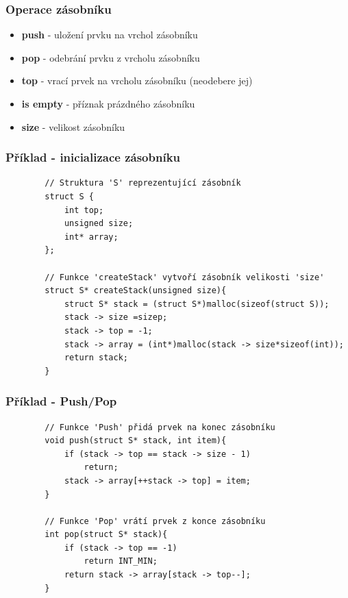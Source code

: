 \documentclass[mode=present, paper=A4paper, orien=landscape, style=default]{beamer}
\begin{document}
\begin{frame}
    \frametitle{Operace zásobníku}
    \begin{itemize}
        \item \textbf{push} - uložení prvku na vrchol zásobníku
        \item \textbf{pop} - odebrání prvku z vrcholu zásobníku
        \item \textbf{top} - vrací prvek na vrcholu zásobníku (neodebere jej)
        \item \textbf{is empty} - příznak prázdného zásobníku
        \item \textbf{size} - velikost zásobníku
    \end{itemize}
\end{frame}

\begin{frame}[fragile]
	\frametitle{Příklad - inicializace zásobníku}  
	\begin{verbatim}
		// Struktura 'S' reprezentující zásobník
		struct S {
		    int top;
		    unsigned size;
		    int* array;
		};
		
		// Funkce 'createStack' vytvoří zásobník velikosti 'size'
		struct S* createStack(unsigned size){
		    struct S* stack = (struct S*)malloc(sizeof(struct S));
		    stack -> size =sizep;
		    stack -> top = -1;
		    stack -> array = (int*)malloc(stack -> size*sizeof(int));
		    return stack;
		}
	\end{verbatim}
\end{frame}

\begin{frame}[fragile]
	\frametitle{Příklad - Push/Pop}  
	\begin{verbatim}
		// Funkce 'Push' přidá prvek na konec zásobníku
		void push(struct S* stack, int item){
		    if (stack -> top == stack -> size - 1)
		        return;
		    stack -> array[++stack -> top] = item;
		}
		 
		// Funkce 'Pop' vrátí prvek z konce zásobníku
		int pop(struct S* stack){
		    if (stack -> top == -1)
		        return INT_MIN;
		    return stack -> array[stack -> top--];
		}
	\end{verbatim}
\end{frame}
\end{document}
